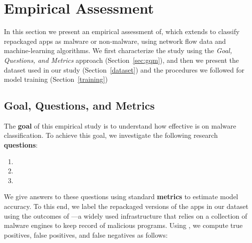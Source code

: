 \section{Empirical Assessment}\label{sec:empirical-study}

In this section we present an empirical assessment of\droidxpflow, which extends \droidxp to classify
repackaged apps as malware or non-malware, using network flow data and machine-learning algorithms.
We first characterize the study using the \emph{Goal, Questions, and Metrics} approach (Section~\ref{sec:gqm}),
and then we present the dataset used in our study (Section~\ref{dataset}) and the procedures
we followed for model training (Section~\ref{training})


\subsection{Goal, Questions, and Metrics}

The {\bf goal} of this empirical study is to understand how effective is \droidxpflow on malware classification.
To achieve this goal, we investigate the following research {\bf questions}:


\begin{enumerate}[(RQ1)]
\item \rqa
\item \rqb
\item \rqc
\end{enumerate}

We give answers to these questions using standard {\bf metrics} to estimate
model accuracy. To this end, we label the repackaged versions
of the apps in our dataset using the outcomes of \vt---a widely used
infrastructure that relies on a collection of malware engines to keep
record of malicious programs. Using \vt, we compute true positives,
false positives, and false negatives as follows:


